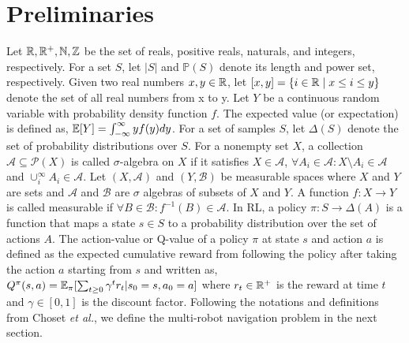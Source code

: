 \documentclass{article}
\begin{document}
\section{Preliminaries}
\label{sec:background}
Let $\mathbb{R}, \mathbb{R}^+, \mathbb{N}, \mathbb{Z}$ be the set of reals, positive reals, naturals, and integers, respectively. For a set $S$, let $|S|$ and $\mathbb{P}(S)$ denote its length and power set, respectively.  Given two real numbers $x,y \in \mathbb{R}$, let $[x,y] = \{ i \in \mathbb{R} \mid x \leq i \leq y \}$ denote the set of all real numbers from x to y. Let $Y$ be a continuous random variable with probability density function $f$. The expected value (or expectation) is defined as, $\mathbb{E}[Y] = \int_{-\infty}^{\infty} y f(y)dy$. For a set of samples $S$, let $\Delta(S)$ denote the set of probability distributions over $S$. For a nonempty set $X$, a collection $\mathcal{A} \subseteq \mathcal{P}(X)$ is called $\sigma$-algebra \citep{tao2011} on $X$ if it satisfies $X \in \mathcal{A}$, $\forall A_i \in \mathcal{A}: X \setminus A_i \in \mathcal{A}$ and $ \cup_i^{\infty}A_i \in \mathcal{A}$. Let $(X, \mathcal{A})$ and $(Y, \mathcal{B})$ be measurable spaces where $X$ and $Y$ are sets and $\mathcal{A}$ and $\mathcal{B}$ are $\sigma$ algebras of subsets of $X$ and $Y$. A function $f: X \to Y$ is called measurable if $\forall B \in \mathcal{B}: f^{-1}(B)\in \mathcal{A}$. In RL, a policy $\pi: S \to \Delta (A)$ is a function that maps a state $s \in S$ to a probability distribution over the set of actions $A$. The action-value or Q-value of a policy $\pi$ at state $s$ and action $a$ is defined as the expected cumulative reward from following the policy after taking the action $a$ starting from $s$ and written as, $Q^{\pi}(s,a) = \mathbb{E}_{\pi}[\sum_{t\geq0}\gamma^t r_t | s_0=s, a_0=a]$ where $r_t \in \mathbb{R}^+$ is the reward at time $t$ and $\gamma \in [0,1]$ is the discount factor. Following the notations and definitions from Choset \textit{et al.}\citep{choset2005}, we define the multi-robot navigation problem in the next section.
\end{document}
